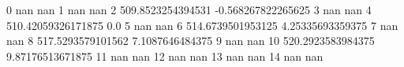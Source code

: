 0 nan nan
1 nan nan
2 509.8523254394531 -0.568267822265625
3 nan nan
4 510.42059326171875 0.0
5 nan nan
6 514.6739501953125 4.25335693359375
7 nan nan
8 517.5293579101562 7.1087646484375
9 nan nan
10 520.2923583984375 9.87176513671875
11 nan nan
12 nan nan
13 nan nan
14 nan nan
